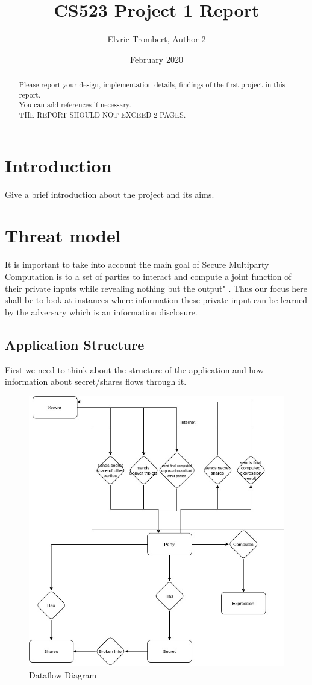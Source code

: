 \documentclass[10pt,conference,compsocconf]{IEEEtran}
\title{CS523 Project 1 Report}
\author{Elvric Trombert, Author 2}
\date{February 2020}
\begin{document}
\maketitle

\begin{abstract}
    Please report your design, implementation details, findings of the first project in this report. \\
    You can add references if necessary. \\
    THE REPORT SHOULD NOT EXCEED 2 PAGES.
\end{abstract}

\section{Introduction}
Give a brief introduction about the project and its aims.

\section{Threat model}
It is important to take into account the main goal of Secure Multiparty Computation is to a set of parties to
interact and compute a joint function of their private inputs while revealing nothing but the
output" \cite{yao}.
Thus our focus here shall be to look at instances where information these private input can be learned by the
adversary which is an information disclosure.
\subsection{Application Structure}
First we need to think about the structure of the application and how information about secret/shares flows through it.

\begin{figure}[ht]
    \centering
    \includegraphics[width=0.5\linewidth]{threat_model.jpg}
    \caption{Dataflow Diagram}
    \label{fig:threat_model}
\end{figure}
\end{document}
